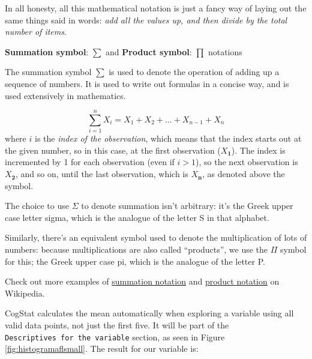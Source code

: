 \documentclass[
]{book}
\newenvironment{callouttitle}{}{}
\theoremstyle{definition}
\theoremstyle{definition}
\theoremstyle{definition}
\theoremstyle{definition}
\theoremstyle{remark}
\begin{document}
In all honesty, all this mathematical notation is just a fancy way of laying out the same things said in words: \emph{add all the values up, and then divide by the total number of items}.

\hypertarget{summation}{}
\begin{callout}

\begin{callouttitle}
\textbf{Summation symbol}: \(\scriptstyle\sum\) and \textbf{Product symbol}: \(\scriptstyle\prod\) notations

\end{callouttitle}

\nopagebreak

The summation symbol \(\scriptstyle\sum\) is used to denote the operation of adding up a sequence of numbers. It is used to write out formulas in a concise way, and is used extensively in mathematics.

\[
\sum_{i=1}^n X_i = X_1 + X_2 + ... + X_{n-1} + X_n
\]
where \(i\) is the \emph{index of the observation}, which means that the index starts out at the given number, so in this case, at the first observation (\(X_\mathbf{1}\)). The index is incremented by 1 for each observation (even if \(i>1\)), so the next observation is \(X_\mathbf{2}\), and so on, until the last observation, which is \(X_\mathbf{n}\), as denoted above the symbol.

The choice to use \(\Sigma\) to denote summation isn't arbitrary: it's the Greek upper case letter sigma, which is the analogue of the letter S in that alphabet.

Similarly, there's an equivalent symbol used to denote the multiplication of lots of numbers: because multiplications are also called ``products'', we use the \(\Pi\) symbol for this; the Greek upper case pi, which is the analogue of the letter P.

Check out more examples of \href{https://en.wikipedia.org/wiki/Summation\#Capital-sigma_notation}{summation notation} and \href{https://en.wikipedia.org/wiki/Multiplication\#Product_of_a_sequence}{product notation} on Wikipedia.

\end{callout}

CogStat calculates the mean automatically when exploring a variable using all valid data points, not just the first five. It will be part of the \texttt{Descriptives\ for\ the\ variable} section, as seen in Figure \ref{fig:histogramaflsmall}. The result for our variable is:
\end{document}
